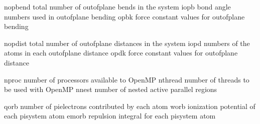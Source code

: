 \documentclass[letterpaper,11pt,english]{sphinxmanual}
\begin{document}
\sphinxAtStartPar
{}

\begin{sphinxVerbatim}[commandchars=\\\{\}]
nopbend         total number of out\PYGZhy{}of\PYGZhy{}plane bends in the system
iopb            bond angle numbers used in out\PYGZhy{}of\PYGZhy{}plane bending
opbk            force constant values for out\PYGZhy{}of\PYGZhy{}plane bending
\end{sphinxVerbatim}

\sphinxAtStartPar
{}

\begin{sphinxVerbatim}[commandchars=\\\{\}]
nopdist         total number of out\PYGZhy{}of\PYGZhy{}plane distances in the system
iopd            numbers of the atoms in each out\PYGZhy{}of\PYGZhy{}plane distance
opdk            force constant values for out\PYGZhy{}of\PYGZhy{}plane distance
\end{sphinxVerbatim}

\sphinxAtStartPar
{}

\begin{sphinxVerbatim}[commandchars=\\\{\}]
nproc           number of processors available to OpenMP
nthread         number of threads to be used with OpenMP
nnest           number of nested active parallel regions
\end{sphinxVerbatim}

\sphinxAtStartPar
{}

\begin{sphinxVerbatim}[commandchars=\\\{\}]
qorb            number of pi\PYGZhy{}electrons contributed by each atom
worb            ionization potential of each pisystem atom
emorb           repulsion integral for each pisystem atom
\end{sphinxVerbatim}

\sphinxAtStartPar
{}
\end{document}
